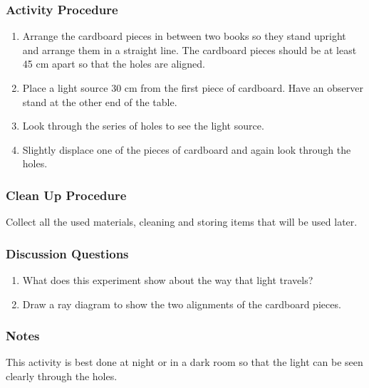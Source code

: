 \subsubsection*{Activity Procedure}
\begin{enumerate}
\item{Arrange the cardboard pieces in between two books so they stand upright and arrange them in a straight line. The cardboard pieces should be at least 45 cm apart so that the holes are aligned.} 
\item{Place a light source 30 cm from the first piece of cardboard. Have an observer stand at the other end of the table.} 
\item{Look through the series of holes to see the light source.}
\item{Slightly displace one of the pieces of cardboard and again look through the holes.}
\end{enumerate}

\subsubsection*{Clean Up Procedure}
Collect all the used materials, cleaning and storing items that will be used later.

\subsubsection*{Discussion Questions}
\begin{enumerate}
\item{What does this experiment show about the way that light travels?}
\item{Draw a ray diagram to show the two alignments of the cardboard pieces.}
\end{enumerate}

\subsubsection*{Notes}
This activity is best done at night or in a dark room so that the light can be seen clearly through the holes.


